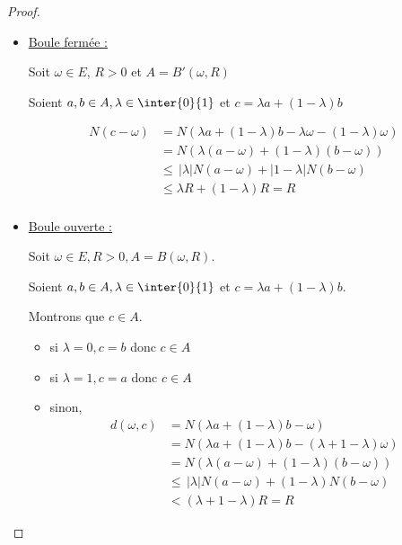 \begin{proof}~\\
    \begin{itemize}
        \item \uline{Boule fermée :}

        Soit $\omega \in E$, $R > 0$ et $A = B'( \omega, R)$
    
        Soient $a, b \in A, \lambda \in \inter{0}{1}$ et $c = \lambda a + (1 - \lambda)b$

        \begin{align*}
            N(c - \omega) & = N(\lambda a + (1 - \lambda)b - \lambda \omega - (1 - \lambda) \omega) \\
            & = N(\lambda(a - \omega) + (1 - \lambda)(b - \omega)) \\
            & \leqslant \, |\lambda| N(a - \omega) + |1 - \lambda| N(b - \omega) \\
            & \leqslant \lambda R + (1 - \lambda)R = R \\
        \end{align*}

        \item \underline{Boule ouverte :}

        Soit $\omega  \in E, R > 0, A = B(\omega, R)$. 

        Soient $a, b \in A, \lambda \in \inter{0}{1}$ et $c = \lambda a + (1 - \lambda)b$.

        Montrons que $c \in A$. 
        \begin{itemize}
            \item si $\lambda = 0, c = b$ donc $c \in A$
            \item si $\lambda = 1, c = a$ donc $c \in A$
            \item sinon, 
                \begin{align*}
                    d(\omega, c) & = N(\lambda a + (1 - \lambda) b - \omega) \\
                    & = N(\lambda a + (1 - \lambda) b - (\lambda + 1- \lambda) \omega) \\
                    & = N(\lambda(a - \omega) + (1 - \lambda) (b - \omega)) \\
                    & \leqslant \, |\lambda| N(a - \omega) + (1 - \lambda)N(b - \omega) \\
                    & < (\lambda + 1 - \lambda) R = R
                \end{align*}
        \end{itemize}
    \end{itemize}
\end{proof}


